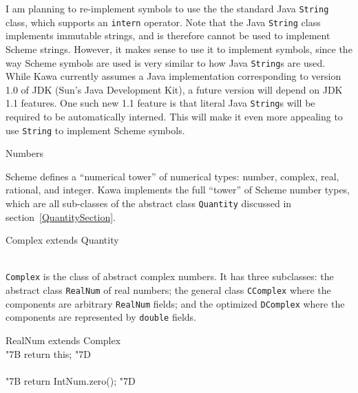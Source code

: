 \documentclass[twocolumn]{article}
\makeatletter
\def\section{\@startsection {section}{1}{\z@}
   {14pt plus 2pt minus 2pt}{12pt plus 2pt minus 2pt} {\large\bf}}
\newcommand{\LBr}{\char"7B}
\newcommand{\RBr}{\char"7D}
\makeatother
\begin{document}
I am planning to re-implement symbols to use the the
standard Java {\tt String} class, which supports an {\tt intern}
operator.  Note that the Java {\tt String} class implements
immutable strings, and is therefore cannot be used to implement
Scheme strings.  However, it makes sense to use it to implement symbols,
since the way Scheme symbols are used is very similar to how
Java {\tt String}s are used.  While Kawa currently assumes a Java
implementation corresponding to version 1.0 of JDK (Sun's Java Development
Kit), a future version will
depend on JDK 1.1 features.  One such new 1.1 feature is that
literal Java {\tt String}s will be required to be automatically
interned.  This will make it even more appealing to use {\tt String}
to implement Scheme symbols.

\section{Numbers}

Scheme defines a ``numerical tower'' of numerical types:
number, complex, real, rational, and integer.
Kawa implements the full ``tower'' of Scheme number types,
which are all sub-classes of the abstract
class {\tt Quantity} discussed in section~\ref{QuantitySection}.

\begin{Class}{Complex}{ extends Quantity}
\\
\\
\end{Class}

{\tt Complex} is the class of abstract complex numbers.
It has three subclasses:  the abstract class {\tt RealNum}
of real numbers;  the general class {\tt CComplex} where the
components are arbitrary {\tt RealNum} fields; and the
optimized {\tt DComplex} where the components
are represented by {\tt double} fields.

\begin{Class}{RealNum}{ extends Complex}
\\
{\LBr} return this; {\RBr}\\
\\
{\LBr} return IntNum.zero(); {\RBr}\\
\\
\end{Class}
\end{document}
